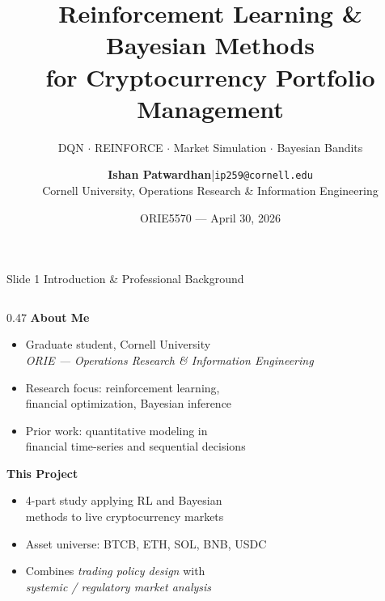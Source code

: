 \documentclass[aspectratio=169, 10pt]{beamer}
\title[RL \& Bayesian Methods for Crypto]{%
  Reinforcement Learning \& Bayesian Methods\\for Cryptocurrency Portfolio Management}
\subtitle{DQN $\cdot$ REINFORCE $\cdot$ Market Simulation $\cdot$ Bayesian Bandits}
\author[Ishan Patwardhan]{%
  \textbf{Ishan Patwardhan}\quad|\quad\texttt{ip259@cornell.edu}\\[2pt]
  \small Cornell University, Operations Research \& Information Engineering}
\date[Apr 30, 2026]{ORIE5570 --- April 30, 2026}
\newcommand{\blu}[1]{{\color{accentblue}#1}}
\begin{document}
\begin{frame}
  \titlepage
\end{frame}

\begin{frame}[t]{Slide 1 \quad Introduction \& Professional Background}
\vspace{2pt}
\begin{columns}[T]

  \begin{column}{0.47\textwidth}
    \textbf{About Me}
    \vspace{2pt}
    \begin{itemize}\setlength\itemsep{3pt}\small
      \item Graduate student, Cornell University\\
            \textit{ORIE --- Operations Research \& Information Engineering}
      \item Research focus: reinforcement learning,\\
            financial optimization, Bayesian inference
      \item Prior work: quantitative modeling in\\
            financial time-series and sequential decisions
    \end{itemize}

    \vspace{6pt}
    \textbf{This Project}
    \vspace{2pt}
    \begin{itemize}\setlength\itemsep{3pt}\small
      \item \blu{4-part} study applying RL and Bayesian\\
            methods to live cryptocurrency markets
      \item Asset universe: BTCB, ETH, SOL, BNB, USDC
      \item Combines \textit{trading policy design} with\\
            \textit{systemic / regulatory market analysis}
    \end{itemize}
  \end{column}


\end{columns}
\end{frame}
\end{document}
